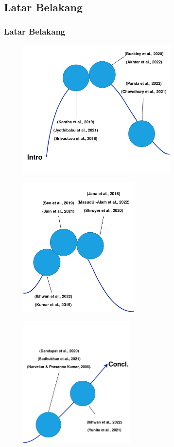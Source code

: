 \documentclass{beamer}
\begin{document}
\subsection{Latar Belakang}
\begin{frame}[allowframebreaks]
\frametitle{Latar Belakang}
	\begin{figure}[H]
		\centering
		\includegraphics[width=8cm]{intro-1}
	\end{figure}
	\begin{figure}[H]
		\centering
		\includegraphics[width=6cm]{intro-2}
	\end{figure}
	\begin{figure}[H]
		\centering
		\includegraphics[width=5.8cm]{intro-3}
	\end{figure}
\end{frame}
\end{document}
